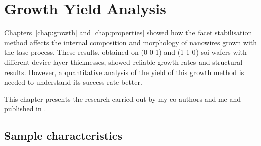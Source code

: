 \chapter{Growth Yield Analysis}
\label{chap:yield_analysis}

Chapters~\ref{chap:growth} and \ref{chap:properties} showed how the  facet stabilisation method affects the internal composition and morphology of nanowires grown with the \acf{tase} process. These results, obtained on \hkl(0 0 1) and \hkl(1 1 0) \acf{soi} wafers with different device layer thicknesses, showed reliable growth rates and structural results. However, a quantitative analysis of the yield of this growth method is needed to understand its success rate better. 

This chapter presents the research carried out by my co-authors and me and published in \cite{Brugnolotto2023_2, Brugnolotto2024}.

\section{Sample characteristics}

